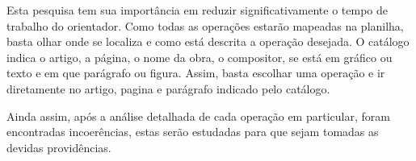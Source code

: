 \documentclass[11pt]{article}
\begin{document}
Esta pesquisa tem sua importância em reduzir significativamente o
tempo de trabalho do orientador. Como todas as operações estarão mapeadas
na planilha, basta olhar onde se localiza e como está descrita a operação
desejada. O catálogo indica o artigo, a página, o nome da obra, o compositor,
se está em gráfico ou texto e em que parágrafo ou figura. Assim, basta escolhar
uma operação e ir diretamente no artigo, pagina e parágrafo indicado pelo
catálogo.

Ainda assim, após a análise detalhada de cada operação em particular,
foram encontradas incoerências, estas serão estudadas para que sejam
tomadas as devidas providências.




\renewcommand{\refname}{Referências bibliográficas (máximo 15)}

\nocite{
  Friedmann1985,
  Friedmann1987,
  Morris1987,
  Marvin1988,
  Polansky1992,
  Morris1993,
  Clifford1995,
  Quinn1997,
  Beard2003,
  Sampaio2008,
  Schultz2008,
  Schultz2009,
  Bor2009
}





\end{document}
